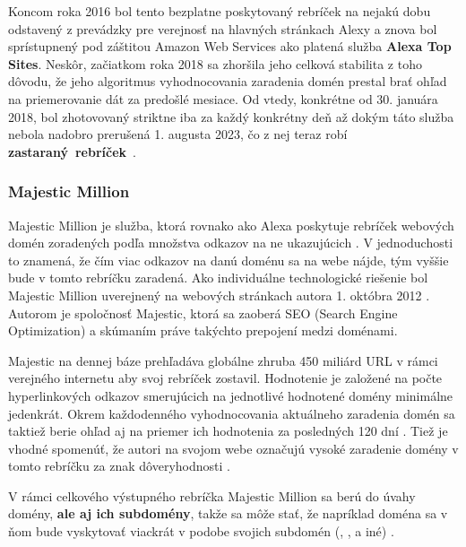 Koncom roka 2016 bol tento bezplatne poskytovaný rebríček na nejakú dobu odstavený z prevádzky pre verejnosť na hlavných stránkach Alexy a znova bol sprístupnený pod záštitou Amazon Web Services ako platená služba \textbf{Alexa Top Sites}. 
Neskôr, začiatkom roka 2018 sa zhoršila jeho celková stabilita z toho dôvodu, že jeho algoritmus vyhodnocovania zaradenia domén prestal brať ohľad na priemerovanie dát za predošlé mesiace.
Od vtedy, konkrétne od 30. januára 2018, bol zhotovovaný striktne iba za každý konkrétny deň \cite{tranco} až dokým táto služba nebola nadobro prerušená 1. augusta 2023, čo z nej teraz robí \mbox{\textbf{zastaraný rebríček} \cite{tranco-methodology}}.

\subsubsection{Majestic Million}

Majestic Million je služba, ktorá rovnako ako Alexa poskytuje rebríček webových domén zoradených podľa množstva odkazov na ne ukazujúcich \cite{majestic-million-homepage, majestic-million-ranking}.
V jednoduchosti to znamená, že čím viac odkazov na danú doménu sa na webe nájde, tým vyššie bude v tomto rebríčku zaradená. 
Ako individuálne technologické riešenie bol Majestic Million uverejnený na webových stránkach autora 1. októbra 2012 \cite{majestic-million-publication}.
Autorom je spoločnosť Majestic, ktorá sa zaoberá SEO (Search Engine Optimization) a skúmaním práve takýchto prepojení medzi doménami.

Majestic na dennej báze prehľadáva globálne zhruba 450 miliárd URL v rámci verejného internetu aby svoj rebríček zostavil. 
Hodnotenie je založené na počte hyperlinkových odkazov smerujúcich na jednotlivé hodnotené domény minimálne jedenkrát.
Okrem každodenného vyhodnocovania aktuálneho zaradenia domén sa taktiež berie ohľad aj na priemer ich hodnotenia za posledných 120 dní \cite{tranco-methodology}.
Tiež je vhodné spomenúť, že autori na svojom webe označujú vysoké zaradenie domény v tomto rebríčku za znak dôveryhodnosti \cite{majestic-million-homepage}.

V rámci celkového výstupného rebríčka Majestic Million sa berú do úvahy domény, \textbf{ale aj ich subdomény}, takže sa môže stať, že napríklad doména  
sa v ňom bude vyskytovať viackrát v podobe svojich subdomén (, ,  a iné) \cite{majestic-million-sub-domain-filtered}.

